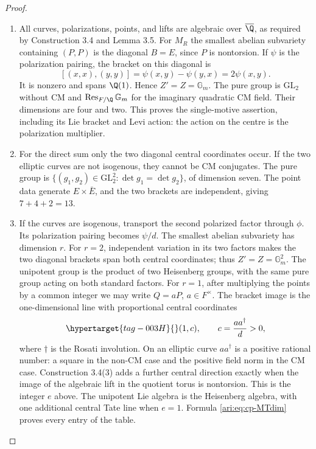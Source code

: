 \begin{proof}
\begin{enumerate}[label=\arabic*.,leftmargin=*]
\item All curves, polarizations, points, and lifts are algebraic over
$\overline\Q$, as required by Construction 3.4 and Lemma 3.5.
For $M_R$ the smallest abelian subvariety containing $(P,P)$ is
the diagonal $B=E$, since $P$ is nontorsion. If $\psi$ is the
polarization pairing, the bracket on this diagonal is
\[
 [(x,x),(y,y)]=\psi(x,y)-\psi(y,x)=2\psi(x,y).
\]
It is nonzero and spans $\Q(1)$. Hence $Z'=Z=\mathbb G_m$.
The pure group is $\mathrm{GL}_2$ without CM and
$\operatorname{Res}_{F/\Q}\mathbb G_m$ for the imaginary
quadratic CM field. Their dimensions are four and two.
This proves the single-motive assertion, including its Lie
bracket and Levi action: the action on the centre is the
polarization multiplier.

\item For the direct sum only the two diagonal central coordinates
occur. If the two elliptic curves are not isogenous, they
cannot be CM conjugates. The pure group is
$\{(g_1,g_2)\in\mathrm{GL}_2^2:\det g_1=\det g_2\}$,
of dimension seven. The point data generate $E\times\bar E$,
and the two brackets are independent, giving $7+4+2=13$.

\item If the curves are isogenous, transport the second polarized
factor through $\phi$. Its polarization pairing becomes
$\psi/d$. The smallest abelian subvariety has dimension $r$.
For $r=2$, independent variation in its two factors makes the
two diagonal brackets span both central coordinates; thus
$Z'=Z=\mathbb G_m^2$. The unipotent group is the product
of two Heisenberg groups, with the same pure group acting
on both standard factors.
For $r=1$, after multiplying the points by a common integer
we may write $Q=aP$, $a\in F^\times$. The bracket image is
the one-dimensional line with proportional central coordinates
\begin{equation}\hypertarget{tag-003H}{}\label{ari:eq:cp-positive-centre}
 (1,c),\qquad c=\frac{a a^\dagger}{d}>0,
\end{equation}
where $\dagger$ is the Rosati involution. On an elliptic curve
$aa^\dagger$ is a positive rational number: a square in the
non-CM case and the positive field norm in the CM case.
Construction 3.4(3) adds a further central direction exactly
when the image of the algebraic lift in the quotient torus
is nontorsion. This is the integer $e$ above.
The unipotent Lie algebra is the Heisenberg algebra, with one
additional central Tate line when $e=1$. Formula
\eqref{ari:eq:cp-MTdim} proves every entry of the table.
\end{enumerate}
\end{proof}